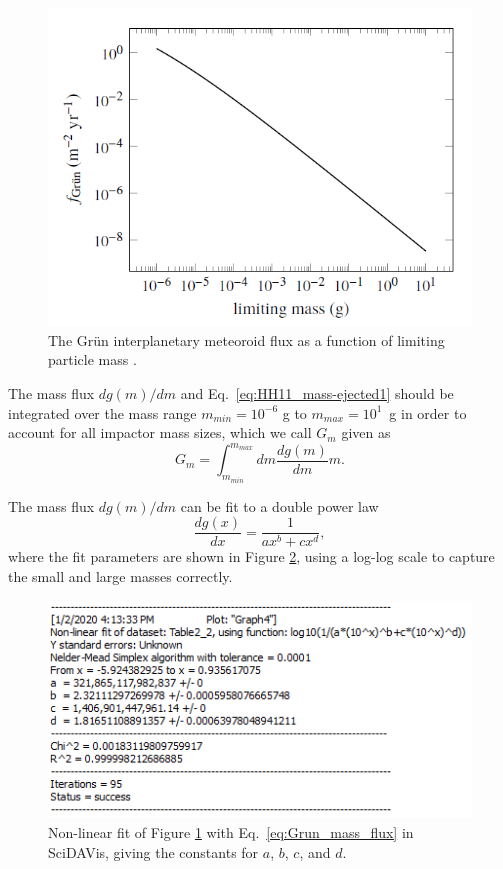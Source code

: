 \documentclass{hitec}
\numberwithin{equation}{section}
\begin{document}
\begin{figure}[h!]
	\centering
	\includegraphics[scale=0.65]{MEM_UG_Fig2.1_partile-mass-distribution.PNG}
	\caption{The Gr{\"u}n interplanetary meteoroid flux as a function of limiting particle mass \citep[Figure 1]{moorhead2019nasa}.}\label{fig:MEM_UG_Fig2.1_partile-mass-distribution}
\end{figure}

The mass flux $dg(m)/dm$ and Eq.\ \ref{eq:HH11_mass-ejected1} should be integrated over the mass range $m_{min} = 10^{-6}$ g to $m_{max} = 10^1$~g in order to account for all impactor mass sizes, which we call $G_m$ given as
\begin{equation}\label{eq:Gm_integral}
G_m = \int_{m_{min}}^{m_{max}}dm\frac{dg(m)}{dm}m.
\end{equation}

The mass flux $dg(m)/dm$ can be fit to a double power law
\begin{equation}\label{eq:Grun_mass_flux}
\frac{dg(x)}{dx} = \frac{1}{ax^b+cx^d},
\end{equation}
where the fit parameters are shown in Figure \ref{fig:Fit-to-D_Grun}, using a log-log scale to capture the small and large masses correctly.

\begin{figure}[h!]
	\centering
	\includegraphics[scale=1]{Fit-to-D_Grun.PNG}
	\caption{Non-linear fit of Figure \ref{fig:MEM_UG_Fig2.1_partile-mass-distribution} with Eq.\ \ref{eq:Grun_mass_flux} in \textsf{SciDAVis}, giving the constants for $a$, $b$, $c$, and $d$.}\label{fig:Fit-to-D_Grun}
\end{figure}
\end{document}
